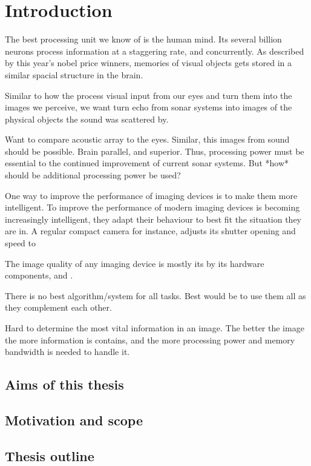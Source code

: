 
\chapter{Introduction}

The best processing unit we know of is the human mind. Its several billion neurons process information at a staggering rate, and concurrently. As described by this year's nobel price winners, memories of visual objects gets stored in a similar spacial structure in the brain.  

Similar to how the process visual input from our eyes and turn them into the images we perceive, we want turn echo from sonar systems into images of the physical objects the sound was scattered by. 

Want to compare acoustic array to the eyes. Similar, this images from sound should be possible. Brain parallel, and superior. Thus, processing power must be essential to the continued improvement of current sonar systems. But *how* should be additional processing power be used?

One way to improve the performance of imaging devices is to make them more intelligent. 
To improve the performance of modern imaging devices is becoming increasingly intelligent, they adapt their behaviour to best fit the situation they are in. A regular compact camera for instance, adjusts its shutter opening and speed to 

The image quality of any imaging device is mostly its by its hardware components, and .

There is no best algorithm/system for all tasks. Best would be to use them all as they complement each other. 

Hard to determine the most vital information in an image. The better the image the more information is contains, and the more processing power and memory bandwidth is needed to handle it.



\section{Aims of this thesis}

\section{Motivation and scope}

\section{Thesis outline}

